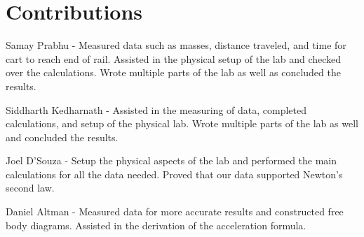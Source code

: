 \section{Contributions}\label{sec:Contributions}

Samay Prabhu - Measured data such as masses, distance traveled, and time for cart to reach end of rail. Assisted in the physical setup of the lab and checked over the calculations. Wrote multiple parts of the lab as well as concluded the results.

Siddharth Kedharnath - Assisted in the measuring of data, completed calculations, and setup of the physical lab. Wrote multiple parts of the lab as well and concluded the results.

Joel D'Souza - Setup the physical aspects of the lab and performed the main calculations for all the data needed. Proved that our data supported Newton's second law.

Daniel Altman - Measured data for more accurate results and constructed free body diagrams. Assisted in the derivation of the acceleration formula.
